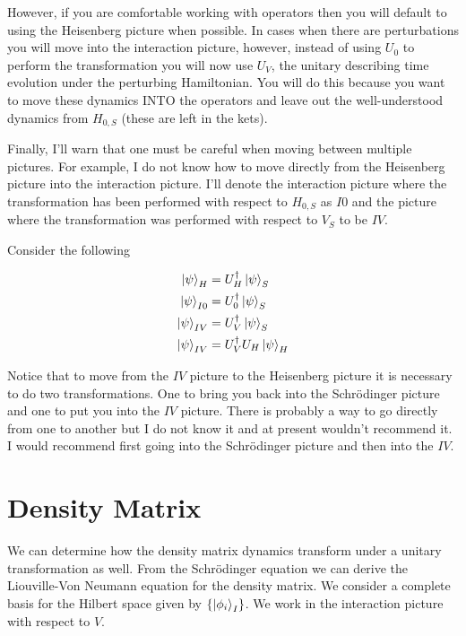 \documentclass[12pt]{article}
\begin{document}
However, if you are comfortable working with operators then you will default to using the Heisenberg picture when possible. In cases when there are perturbations you will move into the interaction picture, however, instead of using $U_0$ to perform the transformation you will now use $U_V$, the unitary describing time evolution under the perturbing Hamiltonian. You will do this because you want to move these dynamics INTO the operators and leave out the well-understood dynamics from $H_{0,S}$ (these are left in the kets).

Finally, I'll warn that one must be careful when moving between multiple pictures. For example, I do not know how to move directly from the Heisenberg picture into the interaction picture. I'll denote the interaction picture where the transformation has been performed with respect to $H_{0,S}$ as $I0$ and the picture where the transformation was performed with respect to $V_S$ to be $IV$.

Consider the following

\begin{align}
\ket{\psi}_H &= U_H^{\dag} \ket{\psi}_S\\
\ket{\psi}_{I0} &= U_0^{\dag} \ket{\psi}_S\\
\ket{\psi}_{IV} &= U_V^{\dag} \ket{\psi}_S\\
\ket{\psi}_{IV} &= U_V^{\dag} U_H \ket{\psi}_H\\
\end{align}

Notice that to move from the $IV$ picture to the Heisenberg picture it is necessary to do two transformations. One to bring you back into the Schr{\"o}dinger picture and one to put you into the $IV$ picture. There is probably a way to go directly from one to another but I do not know it and at present wouldn't recommend it. I would recommend first going into the Schr{\"o}dinger picture and then into the $IV$.

\section{Density Matrix}

We can determine how the density matrix dynamics transform under a unitary transformation as well. From the Schr{\"o}dinger equation we can derive the Liouville-Von Neumann equation for the density matrix.  We consider a complete basis for the Hilbert space given by $\{\ket{\phi_i}_I\}$. We work in the interaction picture with respect to $V$.
\end{document}
